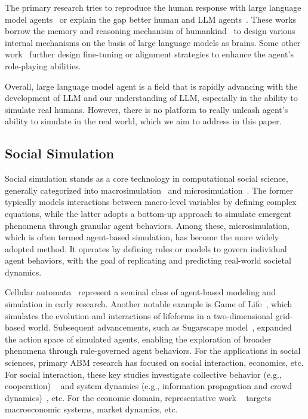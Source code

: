 The primary research tries to reproduce the human response with large language model agents~\cite{park2023generative,zhang2024generative,gao2023s} or explain the gap better human and LLM agents~\cite{huang2024social}.
These works borrow the memory and reasoning mechanism of humankind~\cite{guo2023empowering,zhang2024survey} to design various internal mechanisms on the basis of large language models as brains.
Some other work~\cite{pang2024self,liu2023training} further design fine-tuning or alignment strategies to enhance the agent's role-playing abilities.

Overall, large language model agent is a field that is rapidly advancing with the development of LLM and our understanding of LLM, especially in the ability to simulate real humans. However, there is no platform to really unleash agent's ability to simulate in the real world, which we aim to address in this paper.



\subsection{Social Simulation}
Social simulation stands as a core technology in computational social science, generally categorized into macrosimulation~\cite{troitzsch1996social} and microsimulation~\cite{figari2021empirical}. The former typically models interactions between macro-level variables by defining complex equations, while the latter adopts a bottom-up approach to simulate emergent phenomena through granular agent behaviors. Among these, microsimulation, which is often termed agent-based simulation, has become the more widely adopted method. It operates by defining rules or models to govern individual agent behaviors, with the goal of replicating and predicting real-world societal dynamics.


Cellular automata~\cite{wolfram1983cellular} represent a seminal class of agent-based modeling and simulation in early research. Another notable example is Game of Life~\cite{conway1970game}, which simulates the evolution and interactions of lifeforms in a two-dimensional grid-based world. Subsequent advancements, such as Sugarscape model~\cite{epstein1996growing}, expanded the action space of simulated agents, enabling the exploration of broader phenomena through rule-governed agent behaviors.  For the applications in social sciences, primary ABM research has focused on social interaction, economics, etc. For social interaction, these key studies investigate collective behavior (e.g., cooperation) ~\cite{goldstone2005computational} and system dynamics (e.g., information propagation and crowd dynamics)~\cite{namatame2016agent}, etc. For the economic domain, representative work ~\cite{gallegati2012reconstructing,chen2012agent,axtell2022agent} targets macroeconomic systems, market dynamics, etc.


